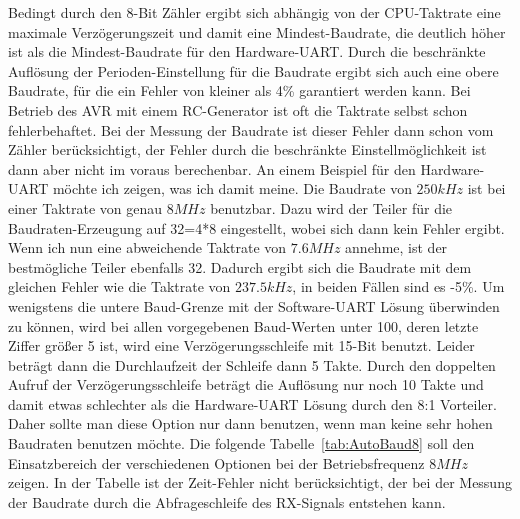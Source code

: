Bedingt durch den 8-Bit Zähler ergibt sich abhängig von der CPU-Taktrate
eine maximale Verzögerungszeit und damit eine Mindest-Baudrate, die
deutlich höher ist als die Mindest-Baudrate für den Hardware-UART.
Durch die beschränkte Auflösung der Perioden-Einstellung für
die Baudrate ergibt sich auch eine obere Baudrate, für die ein Fehler von 
kleiner als 4\% garantiert werden kann.
Bei Betrieb des AVR mit einem RC-Generator ist oft die Taktrate selbst schon
fehlerbehaftet. Bei der Messung der Baudrate ist dieser Fehler dann
schon vom Zähler berücksichtigt, der Fehler durch die beschränkte Einstellmöglichkeit
ist dann aber nicht im voraus berechenbar.
An einem Beispiel für den Hardware-UART  möchte ich zeigen, was ich damit meine.
Die Baudrate von \(250kHz\) ist bei einer Taktrate von genau \(8MHz\) benutzbar.
Dazu wird der Teiler für die Baudraten-Erzeugung auf 32=4*8 eingestellt, wobei sich 
dann kein Fehler ergibt.
Wenn ich nun eine abweichende Taktrate von \(7.6MHz\) annehme, ist
der bestmögliche Teiler ebenfalls 32. Dadurch ergibt sich die Baudrate mit
dem gleichen Fehler wie die Taktrate von \(237.5kHz\), in beiden Fällen sind es -5\%.
Um wenigstens die untere Baud-Grenze mit der Software-UART Lösung überwinden
zu können, wird bei allen vorgegebenen Baud-Werten unter 100, deren letzte Ziffer größer 5 ist,
wird eine Verzögerungsschleife mit 15-Bit benutzt. Leider beträgt dann die Durchlaufzeit
der Schleife dann 5 Takte. Durch den doppelten Aufruf der Verzögerungsschleife beträgt
die Auflösung nur noch 10 Takte und damit etwas schlechter als die Hardware-UART
Lösung durch den 8:1 Vorteiler.
Daher sollte man diese Option nur dann benutzen, wenn man keine sehr hohen Baudraten benutzen möchte.
Die folgende Tabelle~\ref{tab:AutoBaud8} soll den Einsatzbereich der verschiedenen Optionen
bei der Betriebsfrequenz \(8MHz\) zeigen.
In der Tabelle ist der Zeit-Fehler nicht berücksichtigt, der bei der Messung der Baudrate
durch die Abfrageschleife des RX-Signals entstehen kann.

